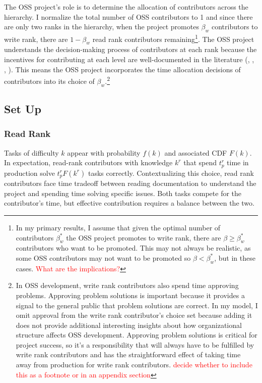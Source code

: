 \documentclass[source/paper/main.tex]{subfiles}
\begin{document}
\qquad The OSS project's role is to determine the allocation of contributors across the hierarchy. I normalize the total number of OSS contributors to 1 and since there are only two ranks in the hierarchy, when the project promotes $\beta_w$ contributors to write rank, there are $1 - \beta_w$ read rank contributors remaining\footnote{In my primary results, I assume that given the optimal number of contributors $\beta_w^*$ the OSS project promotes to write rank, there are $\beta \geq \beta_w^*$  contributors who want to be promoted. This may not always be realistic, as some OSS contributors may not want to be promoted so $\beta < \beta_w^*$, but in these cases. \textcolor{red}{What are the implications?}}. The OSS project understands the decision-making process of contributors at each rank because the incentives for contributing at each level are well-documented in the literature (\cite{lerner_simple_2002}, \cite{lakhani_how_2003}, \cite{von_krogh_community_2003}, \cite{robert_g_wolf_why_2003}). This means the OSS project incorporates the time allocation decisions of contributors into its choice of $\beta_w$.\footnote{In OSS development, write rank contributors also spend time approving problems. Approving problem solutions is important because it provides a signal to the general public that problem solutions are correct. In my model, I omit approval from the write rank contributor's choice set because adding it does not provide additional interesting insights about how organizational structure affects OSS development. Approving problem solutions is critical for project success, so it's a responsibility that will always have to be fulfilled by write rank contributors and has the straightforward effect of taking time away from production for write rank contributors. \textcolor{red}{decide whether to include this as a footnote or in an appendix section}}

\subsection{Set Up}
\subsubsection{Read Rank}
Tasks of difficulty $k$ appear with probability $f(k)$ and associated CDF $F(k)$. In expectation, read-rank contributors with knowledge $k^r$ that spend $t_p^r$ time in production solve $t_p^r F(k^r)$ tasks correctly. Contextualizing this choice, read rank contributors face time tradeoff between reading documentation to understand the project and spending time solving specific issues. Both tasks compete for the contributor's time, but effective contribution requires a balance between the two.
\end{document}
